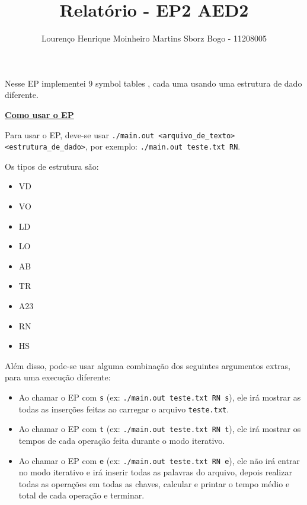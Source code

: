 \documentclass[12pt]{article}
\title{Relatório - EP2 AED2}
\author{Lourenço Henrique Moinheiro Martins Sborz Bogo - 11208005}
\date{}
\newcommand{\mytitle}[1]{\textbf{\underline{#1}}}
\begin{document}
\maketitle

Nesse EP implementei 9 symbol tables , cada uma usando uma estrutura de dado diferente.

\mytitle{Como usar o EP}

Para usar o EP, deve-se usar \texttt{./main.out <arquivo\_de\_texto> <estrutura\_de\_dado>}, por exemplo: \texttt{./main.out teste.txt RN}.

Os tipos de estrutura são:

\begin{itemize}
  
\item VD
  
\item VO
  
\item LD
  
\item LO
  
\item AB
  
\item TR
  
\item A23
  
\item RN
  
\item HS
  
\end{itemize}

Além disso, pode-se usar alguma combinação dos seguintes argumentos extras, para uma execução diferente:

\begin{itemize}
  
\item Ao chamar o EP com \texttt{s} (ex: \texttt{./main.out teste.txt RN s}), ele irá mostrar as todas as inserções feitas ao carregar o arquivo \texttt{teste.txt}.
  
\item Ao chamar o EP com \texttt{t} (ex: \texttt{./main.out teste.txt RN t}), ele irá mostrar os tempos de cada operação feita durante o modo iterativo.
  
\item Ao chamar o EP com \texttt{e} (ex: \texttt{./main.out teste.txt RN e}), ele não irá entrar no modo iterativo e irá inserir todas as palavras do arquivo, depois realizar todas as operações em todas as chaves, calcular e printar o tempo médio e total de cada operação e terminar.
  
\end{itemize}
\end{document}
